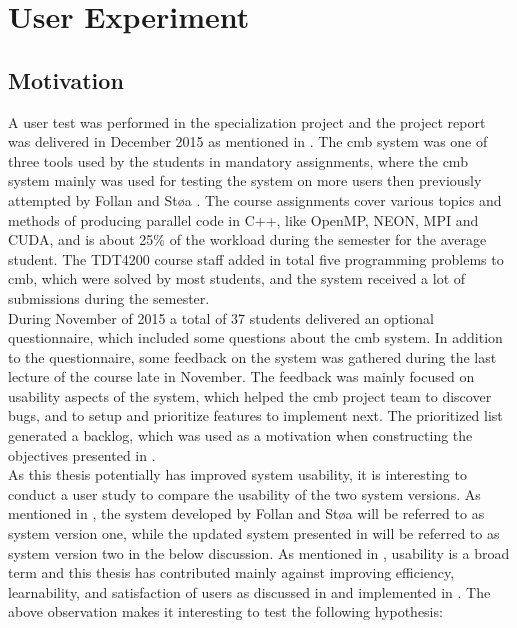 \section{User Experiment}
\label{sec:user-testing}

\subsection{Motivation}
A user test was performed in the specialization project and the project report was delivered in December 2015 as mentioned in . The \gls{cmb} system was one of three tools used by the students in mandatory assignments, where the \gls{cmb} system mainly was used for testing the system on more users then previously attempted by Follan and Støa \cite{mt:T&S}. The course assignments cover various topics and methods of producing parallel code in C++, like OpenMP, NEON, MPI and CUDA, and is about 25\% of the workload during the semester for the average student. The TDT4200 course staff added in total five programming problems to \gls{cmb}, which were solved by most students, and the system received a lot of submissions during the semester. \\

During November of 2015 a total of 37 students delivered an optional questionnaire, which included some questions about the \gls{cmb} system. In addition to the questionnaire, some feedback on the system was gathered during the last lecture of the course late in November. The feedback was mainly focused on usability aspects of the system, which helped the \gls{cmb} project team to discover bugs, and to setup and prioritize features to implement next. The prioritized list generated a backlog, which was used as a motivation when constructing the objectives presented in . \\

As this thesis potentially has improved system usability, it is interesting to conduct a user study to compare the usability of the two system versions. As mentioned in , the system developed by Follan and Støa will be referred to as system version one, while the updated system presented in  will be referred to as system version two in the below discussion. As mentioned in , usability is a broad term and this thesis has contributed mainly against improving efficiency, learnability, and satisfaction of users as discussed in  and implemented in . The above observation makes it interesting to test the following hypothesis:

